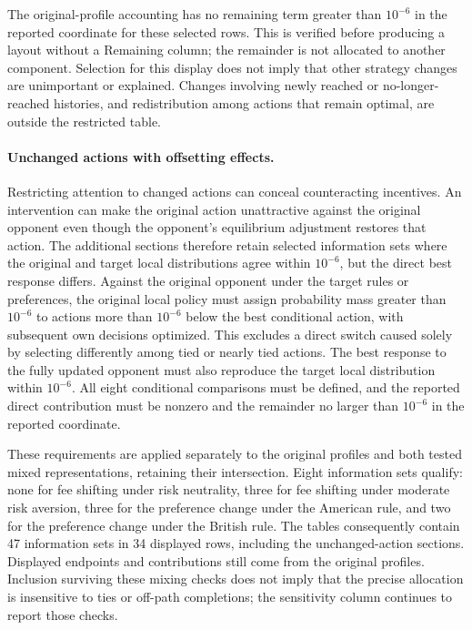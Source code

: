 The original-profile accounting has no remaining term greater than $10^{-6}$
in the reported coordinate for these selected rows. This is verified before
producing a layout without a Remaining column; the remainder is not allocated
to another component. Selection for this display does not imply that other
strategy changes are unimportant or explained. Changes involving newly reached
or no-longer-reached histories, and redistribution among actions that remain
optimal, are outside the restricted table.

\paragraph{Unchanged actions with offsetting effects.}
Restricting attention to changed actions can conceal counteracting incentives.
An intervention can make the original action unattractive against the original
opponent even though the opponent's equilibrium adjustment restores that action.
The additional sections therefore retain selected information sets where the
original and target local distributions agree within $10^{-6}$, but the direct
best response differs. Against the original opponent under the target rules or
preferences, the original local policy must assign probability mass greater
than $10^{-6}$ to actions more than $10^{-6}$ below the best conditional action,
with subsequent own decisions optimized. This excludes a direct switch caused
solely by selecting differently among tied or nearly tied actions. The best
response to the fully updated opponent must also reproduce the target local
distribution within $10^{-6}$. All eight conditional comparisons must be defined,
and the reported direct contribution must be nonzero and the remainder no
larger than $10^{-6}$ in the reported coordinate.

These requirements are applied separately to the original profiles and both
tested mixed representations, retaining their intersection. Eight information
sets qualify: none for fee shifting under risk neutrality, three for fee
shifting under moderate risk aversion, three for the preference change under
the American rule, and two for the preference change under the British rule.
The tables consequently contain 47 information sets in 34 displayed rows,
including the unchanged-action sections. Displayed endpoints and contributions
still come from the original profiles. Inclusion surviving these mixing checks
does not imply that the precise allocation is insensitive to ties or off-path
completions; the sensitivity column continues to report those checks.

